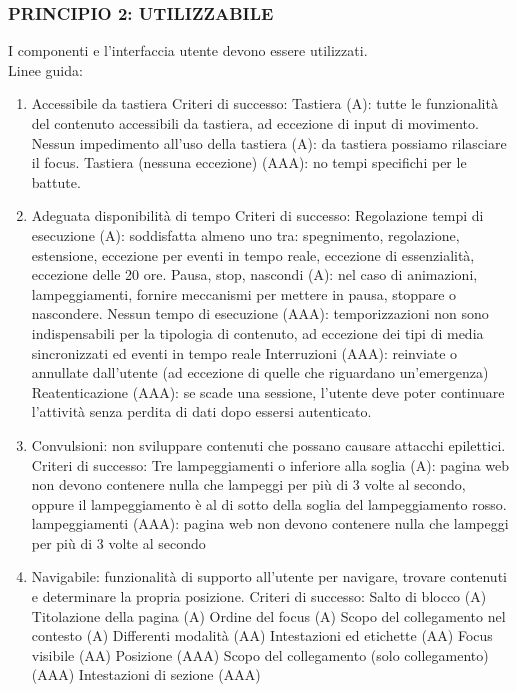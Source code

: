 \documentclass{article}
\begin{document}
\subsubsection{PRINCIPIO 2: UTILIZZABILE}
I componenti e l'interfaccia utente devono essere utilizzati.\\
Linee guida:
\begin{enumerate}
	\item Accessibile da tastiera
	\subitem Criteri di successo:
	\subsubitem Tastiera (A): tutte le funzionalità del contenuto accessibili da tastiera, ad eccezione di input di movimento.
	\subsubitem Nessun impedimento all'uso della tastiera (A): da tastiera possiamo rilasciare il focus.
	\subsubitem Tastiera (nessuna eccezione) (AAA): no tempi specifichi per le battute.
	\item Adeguata disponibilità di tempo
	\subitem Criteri di successo:
	\subsubitem Regolazione tempi di esecuzione (A): soddisfatta almeno uno tra: spegnimento, regolazione, estensione, eccezione per eventi in tempo reale, eccezione di essenzialità, eccezione delle 20 ore.
	\subsubitem Pausa, stop, nascondi (A): nel caso di animazioni, lampeggiamenti, fornire meccanismi per mettere in pausa, stoppare o nascondere.
	\subsubitem Nessun tempo di esecuzione (AAA): temporizzazioni non sono indispensabili per la tipologia di contenuto, ad eccezione dei tipi di media sincronizzati ed eventi in tempo reale
	\subsubitem Interruzioni (AAA): reinviate o annullate dall'utente (ad eccezione di quelle che riguardano un'emergenza)
	\subsubitem Reatenticazione (AAA): se scade una sessione, l'utente deve poter continuare l'attività senza perdita di dati dopo essersi autenticato.
	\item Convulsioni: non sviluppare contenuti che possano causare attacchi epilettici.
	\subitem Criteri di successo:
	\subsubitem Tre lampeggiamenti o inferiore alla soglia (A): pagina web non devono contenere nulla che lampeggi per più di 3 volte al secondo, oppure il lampeggiamento è al di sotto della soglia del lampeggiamento rosso.
	 lampeggiamenti (AAA): pagina web non devono contenere nulla che lampeggi per più di 3 volte al secondo
	\item Navigabile: funzionalità di supporto all'utente per navigare, trovare contenuti e determinare la propria
	 posizione.
	\subitem Criteri di successo:
	\subsubitem Salto di blocco (A)
	\subsubitem Titolazione della pagina (A)
	\subsubitem Ordine del focus (A)
	\subsubitem Scopo del collegamento nel contesto (A)
	\subsubitem Differenti modalità (AA)
	\subsubitem Intestazioni ed etichette (AA)
	\subsubitem Focus visibile (AA)
	\subsubitem Posizione (AAA)
	\subsubitem Scopo del collegamento (solo collegamento) (AAA)
	\subsubitem Intestazioni di sezione (AAA)
\end{enumerate}
\end{document}

